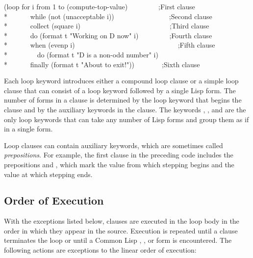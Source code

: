 \begin{lisp}
(loop for i from 1 to (compute-top-value)~~~~~~~~~;{\rm First clause} \\*
~~~~~~while (not (unacceptable i))~~~~~~~~~~~~~~~~;{\rm Second clause} \\*
~~~~~~collect (square i)~~~~~~~~~~~~~~~~~~~~~~~~~~;{\rm Third clause} \\*
~~~~~~do (format t "Working on {\Xtilde}D now" i)~~~~~~~~~;{\rm Fourth clause} \\*
~~~~~~when (evenp i)~~~~~~~~~~~~~~~~~~~~~~~~~~~~~~;{\rm Fifth clause} \\*
~~~~~~~~do (format t "{\Xtilde}D is a non-odd number" i) \\*
~~~~~~finally (format t "About to exit!"))~~~~~~~~;{\rm Sixth clause}
\end{lisp}


  Each loop keyword introduces either a compound loop clause or a simple
  loop clause that can consist of a loop keyword followed by a 
  single Lisp form.  The number of
  forms in a clause is determined by the loop keyword that begins the
  clause and by the auxiliary keywords in the clause.  The keywords
  , , and  are the only loop
  keywords that can take any number of Lisp forms and group them as if
  in a single  form.

  Loop clauses can contain auxiliary keywords, which are sometimes
  called {\it prepositions}.  For example, the first clause in the preceding code
  includes the prepositions  and , which mark
  the value from which stepping begins and the value at which stepping
  ends.

  \subsection{Order of Execution}

  With the exceptions listed below, clauses are executed in the loop body
  in the order in which they appear in the source.  Execution is repeated 
  until a clause
  terminates the loop or until a Common Lisp ,
  , or  form is encountered.  The following actions are
  exceptions to the linear order of execution:


